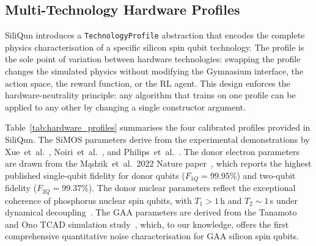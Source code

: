 \subsection{Multi-Technology Hardware Profiles}
\label{subsec:hardware_profiles}

SiliQun introduces a \texttt{TechnologyProfile} abstraction that
encodes the complete physics characterisation of a specific silicon spin
qubit technology.
The profile is the sole point of variation between hardware technologies:
swapping the profile changes the simulated physics without modifying the
Gymnasium interface, the action space, the reward function, or the RL
agent.
This design enforces the hardware-neutrality principle: any algorithm
that trains on one profile can be applied to any other by changing a
single constructor argument.

Table~\ref{tab:hardware_profiles} summarises the four calibrated profiles
provided in SiliQun.
The SiMOS parameters derive from the experimental demonstrations by
Xue~et~al.~\cite{Xue2022}, Noiri~et~al.~\cite{Noiri2022}, and
Philips~et~al.~\cite{Philips2022}.
The donor electron parameters are drawn from the M\k{a}dzik~et~al.\ 2022
Nature paper~\cite{Madzik2022}, which reports the highest published
single-qubit fidelity for donor qubits ($F_{1Q} = 99.95\%$) and
two-qubit fidelity ($F_{2Q} = 99.37\%$).
The donor nuclear parameters reflect the exceptional coherence of
phosphorus nuclear spin qubits, with $T_1 > 1$\,h and $T_2 \sim 1$\,s
under dynamical decoupling~\cite{Morello2020}.
The GAA parameters are derived from the Tanamoto and Ono TCAD
simulation study~\cite{Tanamoto2025}, which, to our knowledge, offers
the first comprehensive quantitative noise characterisation for GAA
silicon spin qubits.

